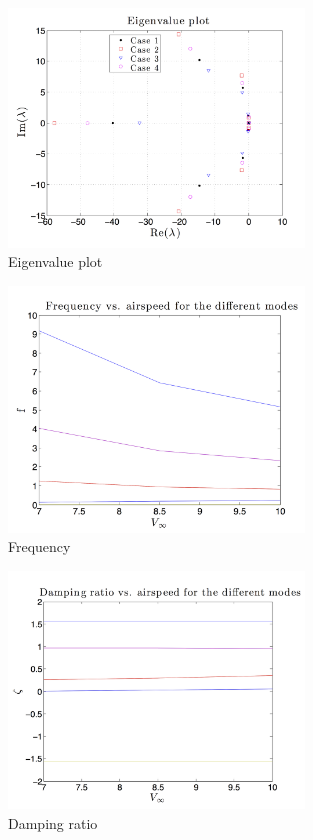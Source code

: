 \documentclass[11pt]{article}
\begin{document}
    \begin{figure}[h!]
    	\centering
    	\includegraphics[width=0.7\textwidth]{Figures/PS2/SkynetV1_eig.png}
    	\caption{Eigenvalue plot}\label{fig:eig}
    \end{figure}
    \begin{figure}[h!]
    	\centering
    	\includegraphics[width=0.7\textwidth]{Figures/PS2/SkynetV1_freq.png}
    	\caption{Frequency}\label{fig:freq}
    \end{figure}
    \begin{figure}[h!]
    	\centering
    	\includegraphics[width=0.7\textwidth]{Figures/PS2/SkynetV1_damp.png}
    	\caption{Damping ratio}\label{fig:damp}
    \end{figure}
\end{document}
